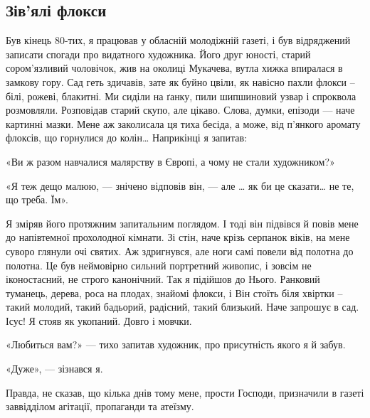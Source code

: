  
 
 

\subsection{Зів’ялі флокси}
\label{sec:02_11_2020.fb.mido_mukachevo.1.zivjali_floksy}

Був кінець 80-тих, я працював у обласній молодіжній газеті, і був відряджений
записати спогади про видатного художника. Його друг юності, старий
сором’язливий чоловічок, жив на околиці Мукачева, вутла хижка впиралася в
замкову гору. Сад геть здичавів, зате як буйно цвіли, як навісно пахли флокси
– білі, рожеві, блакитні. Ми сиділи на ґанку, пили шипшиновий узвар і
спроквола розмовляли. Розповідав старий скупо, але цікаво. Слова, думки,
епізоди --- наче картинні мазки. Мене аж заколисала ця тиха бесіда, а може, від
п’янкого аромату флоксів, що горнулися до колін… Наприкінці я запитав:

«Ви ж разом навчалися малярству в Європі, а чому не стали художником?»

«Я теж дещо малюю, --- знічено відповів він, --- але … як би це сказати… не те, що треба. Їм».

Я зміряв його протяжним запитальним поглядом. І тоді він підвівся й повів мене
до напівтемної прохолодної кімнати. Зі стін, наче крізь серпанок віків, на
мене суворо глянули очі святих. Аж здригнувся, але ноги самі повели від
полотна до полотна. Це був неймовірно сильний портретний живопис, і зовсім не
іконостасний, не строго канонічний. Так я підійшов до Нього. Ранковий
туманець, дерева, роса на плодах, знайомі флокси, і Він стоїть біля хвіртки –
такий молодий, такий бадьорий, радісний, такий близький. Наче запрошує в сад.
Ісус! Я стояв як укопаний. Довго і мовчки.

«Любиться вам?» --- тихо запитав художник, про присутність якого я й забув.

«Дуже», --- зізнався я.

Правда, не сказав, що кілька днів тому мене, прости Господи, призначили в
газеті заввідділом агітації, пропаганди та атеїзму.

